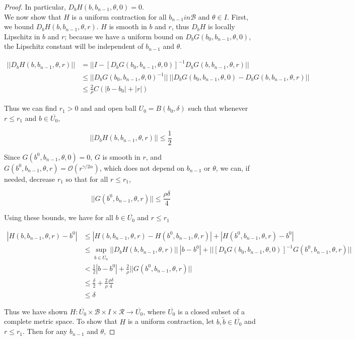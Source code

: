 \documentclass[thesis.tex]{subfiles}
\begin{document}
\begin{theorem}
\begin{proof}
In particular, $D_b H(b, b_{n-1}, \theta, 0) = 0$.\\

We now show that $H$ is a uniform contraction for all $b_{n-1} in \mathcal{B}$ and $\theta \in I$. First, we bound $D_b H(b, b_{n-1}, \theta, r)$. $H$ is smooth in $b$ and $r$, thus $D_b H$ is locally Lipschitz in $b$ and $r$; because we have a uniform bound on $D_b G(b_0, b_{n-1}, \theta, 0)$, the Lipschitz constant will be independent of $b_{n-1}$ and $\theta$.

\begin{align*}
|| D_b H(b, b_{n-1}, \theta, r)||  &= || I - [D_b G(b_0, b_{n-1}, \theta, 0)]^{-1} D_b G(b, b_{n-1}, \theta, r)||  \\
&\leq || D_b G(b_0, b_{n-1}, \theta, 0)^{-1}||\:||D_b G(b_0, b_{n-1}, \theta, 0) - D_b G(b, b_{n-1}, \theta, r)|| \\
&\leq \frac{2}{\rho} C ( |b - b_0| + |r| )
\end{align*}

Thus we can find $r_1 > 0$ and and open ball $U_0 = B(b_0, \delta)$ such that whenever $r \leq r_1$ and $b \in \overline{U_0}$, 

\[
|| D_b H(b, b_{n-1}, \theta, r)|| \leq \frac{1}{2}
\]

Since $G(b^0, b_{n-1}, \theta, 0) = 0$, $G$ is smooth in $r$, and $G(b^0, b_{n-1}, \theta, r) = \mathcal{O}(r^{\gamma / 2 \alpha})$, which does not depend on $b_{n-1}$ or $\theta$, we can, if needed, decrease $r_1$ so that for all $r \leq r_1$,

\[
||G(b^0, b_{n-1}, \theta, r) || \leq \frac{\rho \delta}{4}
\]

Using these bounds, we have for all $b \in \overline{U_0}$ and $r \leq r_1$

\begin{align*}
|H(b, b_{n-1}, \theta, r) - b^0| &\leq |H(b, b_{n-1}, \theta, r) - H(b^0, b_{n-1}, \theta, r)| + |H(b^0, b_{n-1}, \theta, r) - b^0| \\
&\leq \sup_{b\in \overline{U_0}}||D_b H(b, b_{n-1}, \theta, r)||\:|b - b^0| 
+ || [D_b G(b_0, b_{n-1}, \theta, 0)]^{-1} G(b^0, b_{n-1}, \theta, r) || \\
&< \frac{1}{2} |b - b^0| + \frac{2}{\rho} ||G(b^0, b_{n-1}, \theta, r) ||  \\
&\leq \frac{\delta}{2} + \frac{2}{\rho}\frac{\rho \delta}{4} \\
&\leq \delta
\end{align*} 

Thus we have shown $H: \overline{U_0} \times \mathcal{B} \times I \times \mathcal{R} \rightarrow \overline{U_0}$, where $\overline{U_0}$ is a closed subset of a complete metric space. To show that $H$ is a uniform contraction, let $b, \tilde{b} \in \overline{U_0}$ and $r \leq r_1$. Then for any $b_{n-1}$ and $\theta$,


\end{proof}
\end{theorem}
\end{document}
